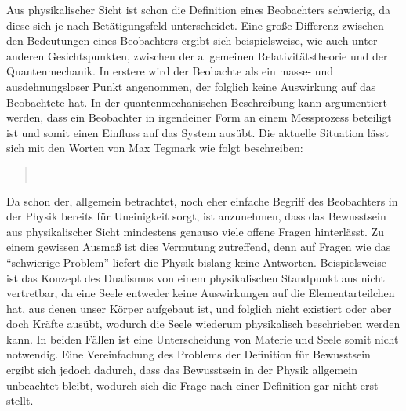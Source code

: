 Aus physikalischer Sicht ist schon die Definition eines Beobachters schwierig, da diese sich je nach 
Betätigungsfeld unterscheidet. Eine große Differenz zwischen den Bedeutungen eines Beobachters
ergibt sich beispielsweise, wie auch unter anderen Gesichtspunkten, 
zwischen der allgemeinen Relativitätstheorie und der Quantenmechanik. In erstere wird der Beobachte als ein
masse- und ausdehnungsloser Punkt angenommen, der folglich keine Auswirkung auf das Beobachtete hat.
In der quantenmechanischen Beschreibung kann argumentiert werden, dass ein Beobachter in irgendeiner 
Form an einem Messprozess beteiligt ist und somit einen Einfluss auf das System ausübt.
Die aktuelle Situation lässt sich mit den Worten von Max Tegmark wie folgt beschreiben: 
\begin{quote}
	\,\cite{Tegmark_15_long}
\end{quote}   
Da schon der, allgemein betrachtet, noch eher einfache Begriff des Beobachters in der Physik bereits für Uneinigkeit sorgt,
ist anzunehmen, dass das Bewusstsein aus physikalischer Sicht mindestens genauso viele offene Fragen hinterlässt.
Zu einem gewissen Ausmaß ist dies Vermutung zutreffend, denn auf Fragen wie das \enquote{schwierige Problem} 
liefert die Physik bislang keine Antworten. Beispielsweise ist das Konzept des Dualismus von einem physikalischen 
Standpunkt aus nicht vertretbar, da eine Seele entweder keine Auswirkungen auf
die Elementarteilchen hat, aus denen unser Körper aufgebaut ist, und folglich nicht existiert oder aber doch Kräfte 
ausübt, wodurch die Seele wiederum physikalisch beschrieben werden kann. In beiden Fällen ist eine Unterscheidung von 
Materie und Seele somit nicht notwendig.
Eine Vereinfachung des Problems der Definition für Bewusstsein ergibt sich jedoch dadurch, dass das Bewusstsein in der Physik
allgemein unbeachtet bleibt, wodurch sich die Frage nach einer Definition gar nicht erst stellt.\,\cite{Tegmark_15_long} 




